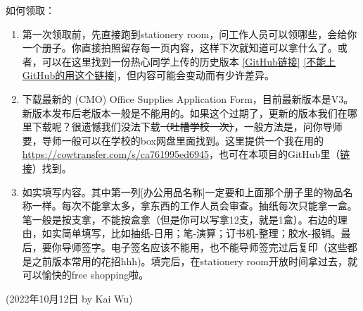 \hfill\break
如何领取：
\begin{enumerate}
    \item 第一次领取前，先直接跑到stationery room，问工作人员可以领哪些，会给你一个册子。你直接拍照留存每一页内容，这样下次就知道可以拿什么了。或者，可以在这里找到一份热心同学上传的历史版本 \href{https://github.com/kaiwu-astro/xp_pgrs_unofficial_guide/tree/main/fileshare}{[GitHub链接]} \href{https://cowtransfer.com/s/ca761995ed6945}{[不能上GitHub的用这个链接]}，但内容可能会变动而有少许差异。
    \item 下载最新的 (CMO) Office Supplies Application Form，目前最新版本是V3。新版本发布后老版本一般是不能用的。如果这个过期了，更新的版本我们在哪里下载呢？很遗憾我们没法下载\sout{（吐槽学校一次）}，一般方法是，问你导师要，导师一般可以在学校的box网盘里面找到。这里提供一个我在用的 \url{https://cowtransfer.com/s/ca761995ed6945}，也可在本项目的GitHub里（\href{https://github.com/kaiwu-astro/xp_pgrs_unofficial_guide/tree/main/fileshare}{链接}）找到。
    \item 如实填写内容。其中第一列[办公用品名称]一定要和上面那个册子里的物品名称一样。每次不能拿太多，拿东西的工作人员会审查。抽纸每次只能拿一盒。笔一般是按支拿，不能按盒拿（但是你可以写拿12支，就是1盒）。右边的理由，如实简单填写，比如抽纸-日用；笔-演算；订书机-整理；胶水-报销。最后，要你导师签字。电子签名应该不能用，也不能导师签完过后复印（这些都是之前版本常用的花招hhh)。填完后，在stationery room开放时间拿过去，就可以愉快的free shopping啦。
\end{enumerate}


\begin{flushright}
(2022年10月12日 by Kai Wu)
\end{flushright}